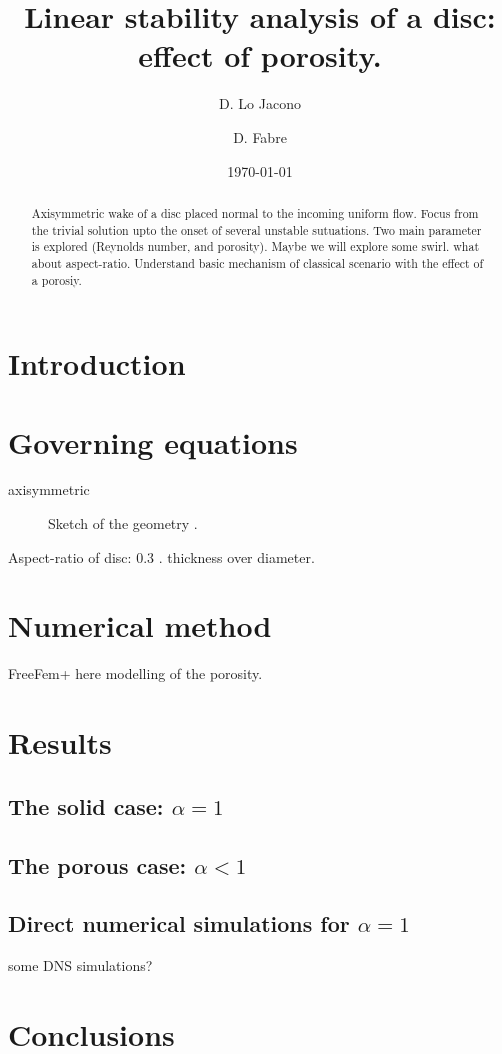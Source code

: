 \documentclass[showpacs,preprintnumbers,amsmath,amssymb,aps]{revtex4-1}
\begin{document}
\title{{\bf Linear stability analysis of a disc: effect of porosity.}} 
\author{D. Lo Jacono}
\author{D. Fabre}
\date{\today}

\begin{abstract}
Axisymmetric wake of a disc placed normal to the incoming uniform flow. Focus from the trivial solution upto the onset of several unstable sutuations. Two main parameter is explored (Reynolds number, and porosity). Maybe we will explore some swirl. what about aspect-ratio. Understand basic mechanism of classical scenario with the effect of a porosiy. 
\end{abstract}   
\maketitle

\section{Introduction}


\section{Governing equations}\label{equations}
axisymmetric



\begin{figure}
\caption{Sketch of the geometry .\label{sketch}}
\end{figure}
Aspect-ratio of disc: 0.3 . thickness over diameter. 


\section{Numerical method}
\label{numerics}
FreeFem+
here modelling of the porosity.
\cite{thompson:96}
\section{Results}
\label{results}
\subsection{The solid case: $\alpha=1$}


\subsection{The porous case: $\alpha<1$}


\subsection{Direct numerical simulations for $\alpha=1$}
some DNS simulations?

\section{Conclusions}\label{conclusions}


\end{document}
